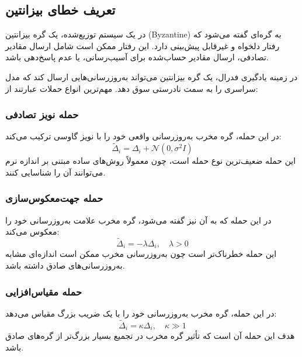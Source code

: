 \subsection{تعریف خطای بیزانتین}

\begin{ntdefinition}
در یک سیستم توزیع‌شده، یک گره بیزانتین (\gls{Byzantine}) به گره‌ای گفته می‌شود که رفتار دلخواه و غیرقابل پیش‌بینی دارد. این رفتار ممکن است شامل ارسال مقادیر تصادفی، ارسال مقادیر حساب‌شده برای آسیب‌رسانی، یا عدم پاسخ‌دهی باشد.
\end{ntdefinition}

در زمینه یادگیری فدرال، یک گره بیزانتین می‌تواند به‌روزرسانی‌هایی ارسال کند که مدل سراسری را به سمت نادرستی سوق دهد. مهم‌ترین انواع حملات عبارتند از:

\subsubsection{حمله نویز تصادفی}
در این حمله، گره مخرب به‌روزرسانی واقعی خود را با نویز گاوسی ترکیب می‌کند:
\begin{equation}
    \tilde{\Delta}_i = \Delta_i + \mathcal{N}(0, \sigma^2 I)
    \label{eq:noise_attack}
\end{equation}
این حمله ضعیف‌ترین نوع حمله است، چون معمولاً روش‌های ساده مبتنی بر اندازه نرم می‌توانند آن را شناسایی کنند.

\subsubsection{حمله جهت‌معکوس‌سازی}
در این حمله که به آن  نیز گفته می‌شود، گره مخرب علامت به‌روزرسانی خود را معکوس می‌کند:
\begin{equation}
    \tilde{\Delta}_i = -\lambda \Delta_i, \quad \lambda > 0
    \label{eq:sign_flip}
\end{equation}
این حمله خطرناک‌تر است چون به‌روزرسانی مخرب ممکن است اندازه‌ای مشابه به‌روزرسانی‌های صادق داشته باشد.

\subsubsection{حمله مقیاس‌افزایی}
در این حمله، گره مخرب به‌روزرسانی خود را با یک ضریب بزرگ مقیاس می‌دهد:
\begin{equation}
    \tilde{\Delta}_i = \kappa \Delta_i, \quad \kappa \gg 1
    \label{eq:scaling_attack}
\end{equation}
هدف این حمله آن است که تأثیر گره مخرب در تجمیع بسیار بزرگ‌تر از گره‌های صادق باشد.

